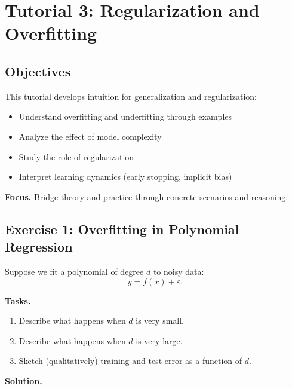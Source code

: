 \section{Tutorial 3: Regularization and Overfitting}

\subsection{Objectives}

This tutorial develops intuition for generalization and regularization:
\begin{itemize}
    \item Understand overfitting and underfitting through examples
    \item Analyze the effect of model complexity
    \item Study the role of regularization
    \item Interpret learning dynamics (early stopping, implicit bias)
\end{itemize}

\medskip

\noindent
\textbf{Focus.}  
Bridge theory and practice through concrete scenarios and reasoning.

\subsection{Exercise 1: Overfitting in Polynomial Regression}

Suppose we fit a polynomial of degree $d$ to noisy data:
\[
y = f(x) + \varepsilon.
\]

\medskip

\noindent
\textbf{Tasks.}
\begin{enumerate}
    \item Describe what happens when $d$ is very small.
    \item Describe what happens when $d$ is very large.
    \item Sketch (qualitatively) training and test error as a function of $d$.
\end{enumerate}

\medskip

\noindent
\textbf{Solution.}

